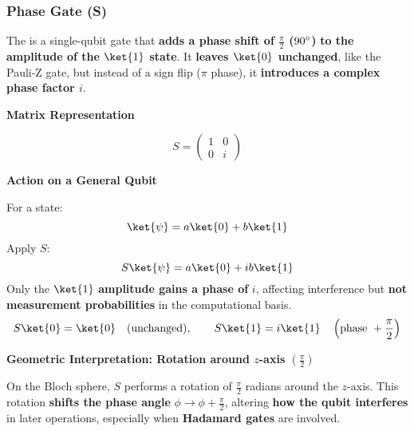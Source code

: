 \subsubsection{Phase Gate (S)}\label{subsubsection: Phase Gate S}

The  is a single-qubit gate that \textbf{adds a phase shift of $\frac{\pi}{2}$ ($90\degree$)} \textbf{to the amplitude of the $\ket{1}$ state}. It \textbf{leaves $\ket{0}$ unchanged}, like the Pauli-Z gate, but instead of a sign flip ($\pi$ phase), it \textbf{introduces a complex phase factor $i$}.

\highspace
\begin{flushleft}
    \textcolor{Green3}{ \textbf{Matrix Representation}}
\end{flushleft}
\begin{equation}
    S = \begin{pmatrix}
        1 & 0 \\ 0 & i
    \end{pmatrix}
\end{equation}

\highspace
\begin{flushleft}
    \textcolor{Green3}{ \textbf{Action on a General Qubit}}
\end{flushleft}
For a state:
\begin{equation*}
    \ket{\psi} = a\ket{0} + b\ket{1}
\end{equation*}
Apply $S$:
\begin{equation*}
    S\ket{\psi} = a\ket{0} + ib\ket{1}
\end{equation*}
Only the $\ket{1}$ \textbf{amplitude gains a phase of} $i$, affecting interference but \textbf{not measurement probabilities} in the computational basis.
\begin{equation*}
    S\ket{0} = \ket{0} \hspace{1em} \text{(unchanged)}, \hspace{2em} S\ket{1} = i\ket{1} \hspace{1em} \left(\text{phase } + \frac{\pi}{2}\right)
\end{equation*}

\highspace
\begin{flushleft}
    \textcolor{Green3}{ \textbf{Geometric Interpretation: Rotation around $z$-axis $\left(\frac{\pi}{2}\right)$}}
\end{flushleft}
On the Bloch sphere, $S$ performs a rotation of $\frac{\pi}{2}$ radians around the $z$-axis. This rotation \textbf{shifts the phase angle} $\phi \rightarrow \phi + \frac{\pi}{2}$, altering \textbf{how the qubit interferes} in later operations, especially when \textbf{Hadamard gates} are involved.

